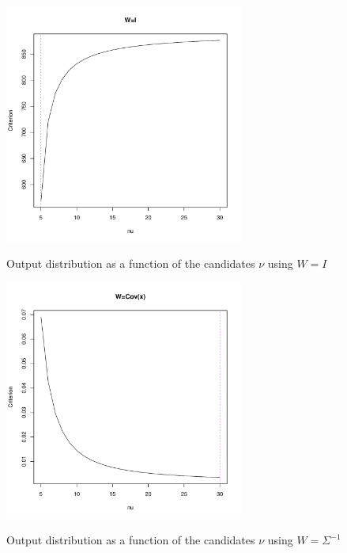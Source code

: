 \newpage

\begin{figure}
    \centering
    \includegraphics[width=0.7\textwidth]{S&P500_returns_criterion_(W=I).pdf}
    \label{SP500_returns_criterion_I}
    \caption{Output distribution as a function of the candidates $\nu$ using $W=I$}
    \includegraphics[width=0.7\textwidth]{S&P500_returns_criterion_(W=Sigma^-1).pdf}
    \label{SP500_returns_criterion_W}
    \caption{Output distribution as a function of the candidates $\nu$ using $W=\Sigma^{-1}$}
\end{figure}

